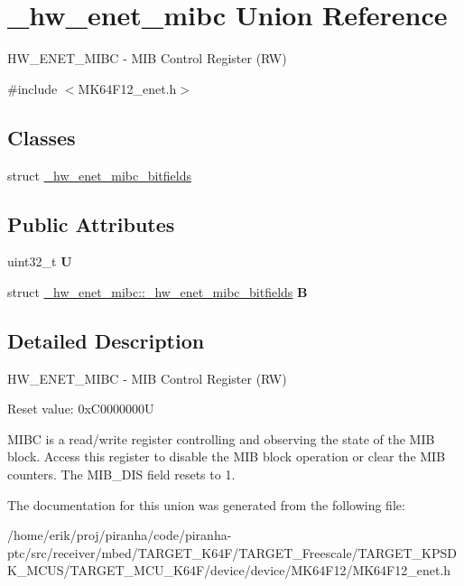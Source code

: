 \hypertarget{union__hw__enet__mibc}{}\section{\+\_\+hw\+\_\+enet\+\_\+mibc Union Reference}
\label{union__hw__enet__mibc}


H\+W\+\_\+\+E\+N\+E\+T\+\_\+\+M\+I\+BC -\/ M\+IB Control Register (RW)  




{\ttfamily \#include $<$M\+K64\+F12\+\_\+enet.\+h$>$}

\subsection*{Classes}
\begin{DoxyCompactItemize}
\item 
struct \hyperlink{struct__hw__enet__mibc_1_1__hw__enet__mibc__bitfields}{\+\_\+hw\+\_\+enet\+\_\+mibc\+\_\+bitfields}
\end{DoxyCompactItemize}
\subsection*{Public Attributes}
\begin{DoxyCompactItemize}
\item 
uint32\+\_\+t {\bfseries U}\hypertarget{union__hw__enet__mibc_a27ef9120bea288f007db0039445e50f0}{}\label{union__hw__enet__mibc_a27ef9120bea288f007db0039445e50f0}

\item 
struct \hyperlink{struct__hw__enet__mibc_1_1__hw__enet__mibc__bitfields}{\+\_\+hw\+\_\+enet\+\_\+mibc\+::\+\_\+hw\+\_\+enet\+\_\+mibc\+\_\+bitfields} {\bfseries B}\hypertarget{union__hw__enet__mibc_ab3b98859da2d42d66719b85828a361fb}{}\label{union__hw__enet__mibc_ab3b98859da2d42d66719b85828a361fb}

\end{DoxyCompactItemize}


\subsection{Detailed Description}
H\+W\+\_\+\+E\+N\+E\+T\+\_\+\+M\+I\+BC -\/ M\+IB Control Register (RW) 

Reset value\+: 0x\+C0000000U

M\+I\+BC is a read/write register controlling and observing the state of the M\+IB block. Access this register to disable the M\+IB block operation or clear the M\+IB counters. The M\+I\+B\+\_\+\+D\+IS field resets to 1. 

The documentation for this union was generated from the following file\+:\begin{DoxyCompactItemize}
\item 
/home/erik/proj/piranha/code/piranha-\/ptc/src/receiver/mbed/\+T\+A\+R\+G\+E\+T\+\_\+\+K64\+F/\+T\+A\+R\+G\+E\+T\+\_\+\+Freescale/\+T\+A\+R\+G\+E\+T\+\_\+\+K\+P\+S\+D\+K\+\_\+\+M\+C\+U\+S/\+T\+A\+R\+G\+E\+T\+\_\+\+M\+C\+U\+\_\+\+K64\+F/device/device/\+M\+K64\+F12/M\+K64\+F12\+\_\+enet.\+h\end{DoxyCompactItemize}
